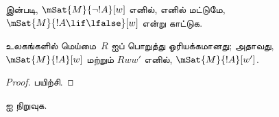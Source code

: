 \documentclass[../../../include/open-logic-section]{subfiles}
\begin{document}
\begin{prob}
   இன்படி,
  $\mSat{M}{\lnot !A}[w]$ எனில், எனில் மட்டுமே,
  $\mSat{M}{!A \lif \lfalse}[w]$ என்று காட்டுக.
\end{prob}

\begin{prop}
  உலகங்களில் மெய்மை~$R$ ஐப் பொறுத்து ஓரியக்கமானது; அதாவது,
  $\mSat{M}{!A}[w]$ மற்றும் $Rww'$ எனில், $\mSat{M}{!A}[w']$.
\end{prop}

\begin{proof}
  பயிற்சி.
\end{proof}

\begin{prob}
   ஐ நிறுவுக.
\end{prob}
\end{document}
